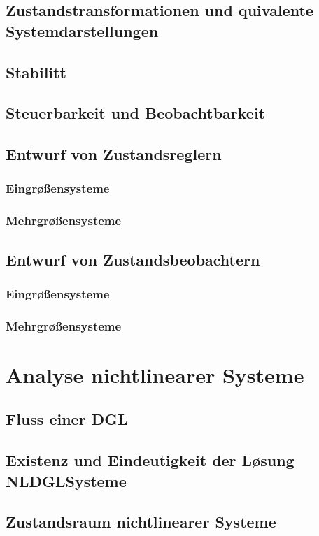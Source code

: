 \subsection{Zustandstransformationen und \a quivalente Systemdarstellungen}
\subsection{Stabilit\a t}
\subsection{Steuerbarkeit und Beobachtbarkeit}
\subsection{Entwurf von Zustandsreglern}
\subsubsection{Eingr\o \ss ensysteme}
\subsubsection{Mehrgr\o \ss ensysteme}
\subsection{Entwurf von Zustandsbeobachtern}
\subsubsection{Eingr\o \ss ensysteme}
\subsubsection{Mehrgr\o \ss ensysteme}


\section{Analyse nichtlinearer Systeme}
\subsection{Fluss einer DGL}
\subsection{Existenz und Eindeutigkeit der L\o sung NLDGLSysteme}
\subsection{Zustandsraum nichtlinearer Systeme}
